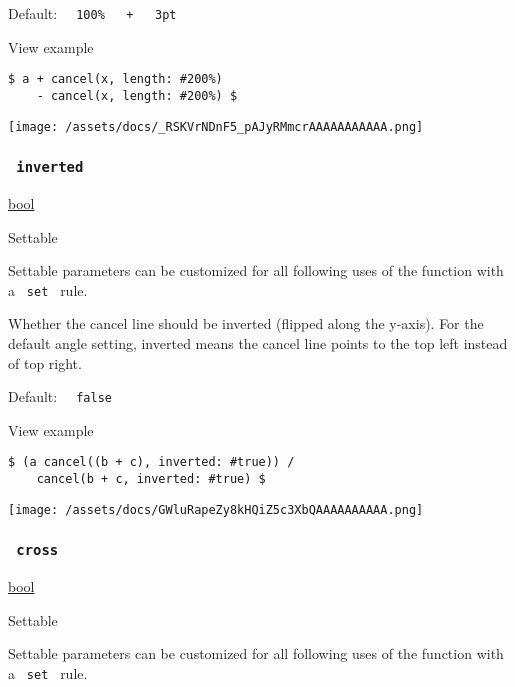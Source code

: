Default:
\texttt{\ }{\texttt{\ 100\%\ }}\texttt{\ }{\texttt{\ +\ }}\texttt{\ }{\texttt{\ 3pt\ }}\texttt{\ }


View example

\begin{verbatim}
$ a + cancel(x, length: #200%)
    - cancel(x, length: #200%) $
\end{verbatim}

\texttt{[image: /assets/docs/\_RSKVrNDnF5\_pAJyRMmcrAAAAAAAAAAA.png]}

\subsubsection{\texorpdfstring{\texttt{\ inverted\ }}{ inverted }}\label{parameters-inverted}

\href{/docs/reference/foundations/bool/}{bool}

{{ Settable }}

\label{parameters-inverted-settable-tooltip}
Settable parameters can be customized for all following uses of the
function with a \texttt{\ set\ } rule.

Whether the cancel line should be inverted (flipped along the y-axis).
For the default angle setting, inverted means the cancel line points to
the top left instead of top right.

Default: \texttt{\ }{\texttt{\ false\ }}\texttt{\ }


View example

\begin{verbatim}
$ (a cancel((b + c), inverted: #true)) /
    cancel(b + c, inverted: #true) $
\end{verbatim}

\texttt{[image: /assets/docs/GWluRapeZy8kHQiZ5c3XbQAAAAAAAAAA.png]}

\subsubsection{\texorpdfstring{\texttt{\ cross\ }}{ cross }}\label{parameters-cross}

\href{/docs/reference/foundations/bool/}{bool}

{{ Settable }}

\label{parameters-cross-settable-tooltip}
Settable parameters can be customized for all following uses of the
function with a \texttt{\ set\ } rule.

